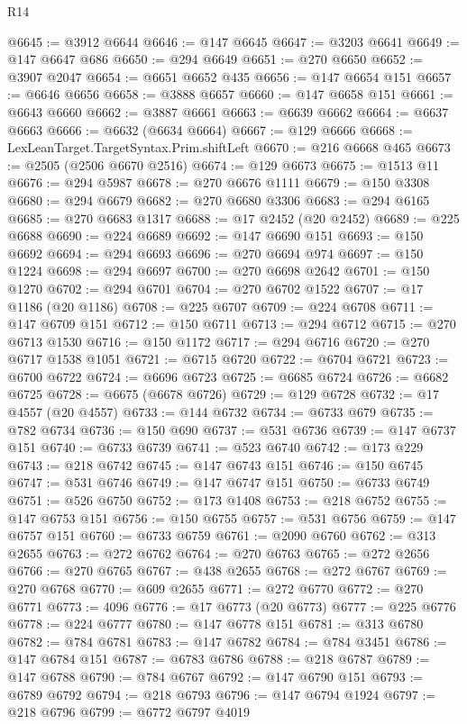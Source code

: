 \begin{lexlean}{R14}
\begin{coremodule}
@6645 := @3912 @6644
@6646 := @147 @6645
@6647 := @3203 @6641
@6649 := @147 @6647 @686
@6650 := @294 @6649
@6651 := @270 @6650
@6652 := @3907 @2047
@6654 := @6651 @6652 @435
@6656 := @147 @6654 @151
@6657 := @6646 @6656
@6658 := @3888 @6657
@6660 := @147 @6658 @151
@6661 := @6643 @6660
@6662 := @3887 @6661
@6663 := @6639 @6662
@6664 := @6637 @6663
@6666 := @6632 (@6634 @6664)
@6667 := @129 @6666
@6668 := LexLeanTarget.TargetSyntax.Prim.shiftLeft
@6670 := @216 @6668 @465
@6673 := @2505 (@2506 @6670 @2516)
@6674 := @129 @6673
@6675 := @1513 @11
@6676 := @294 @5987
@6678 := @270 @6676 @1111
@6679 := @150 @3308
@6680 := @294 @6679
@6682 := @270 @6680 @3306
@6683 := @294 @6165
@6685 := @270 @6683 @1317
@6688 := @17 @2452 (@20 @2452)
@6689 := @225 @6688
@6690 := @224 @6689
@6692 := @147 @6690 @151
@6693 := @150 @6692
@6694 := @294 @6693
@6696 := @270 @6694 @974
@6697 := @150 @1224
@6698 := @294 @6697
@6700 := @270 @6698 @2642
@6701 := @150 @1270
@6702 := @294 @6701
@6704 := @270 @6702 @1522
@6707 := @17 @1186 (@20 @1186)
@6708 := @225 @6707
@6709 := @224 @6708
@6711 := @147 @6709 @151
@6712 := @150 @6711
@6713 := @294 @6712
@6715 := @270 @6713 @1530
@6716 := @150 @1172
@6717 := @294 @6716
@6720 := @270 @6717 @1538 @1051
@6721 := @6715 @6720
@6722 := @6704 @6721
@6723 := @6700 @6722
@6724 := @6696 @6723
@6725 := @6685 @6724
@6726 := @6682 @6725
@6728 := @6675 (@6678 @6726)
@6729 := @129 @6728
@6732 := @17 @4557 (@20 @4557)
@6733 := @144 @6732
@6734 := @6733 @679
@6735 := @782 @6734
@6736 := @150 @690
@6737 := @531 @6736
@6739 := @147 @6737 @151
@6740 := @6733 @6739
@6741 := @523 @6740
@6742 := @173 @229
@6743 := @218 @6742
@6745 := @147 @6743 @151
@6746 := @150 @6745
@6747 := @531 @6746
@6749 := @147 @6747 @151
@6750 := @6733 @6749
@6751 := @526 @6750
@6752 := @173 @1408
@6753 := @218 @6752
@6755 := @147 @6753 @151
@6756 := @150 @6755
@6757 := @531 @6756
@6759 := @147 @6757 @151
@6760 := @6733 @6759
@6761 := @2090 @6760
@6762 := @313 @2655
@6763 := @272 @6762
@6764 := @270 @6763
@6765 := @272 @2656
@6766 := @270 @6765
@6767 := @438 @2655
@6768 := @272 @6767
@6769 := @270 @6768
@6770 := @609 @2655
@6771 := @272 @6770
@6772 := @270 @6771
@6773 := 4096
@6776 := @17 @6773 (@20 @6773)
@6777 := @225 @6776
@6778 := @224 @6777
@6780 := @147 @6778 @151
@6781 := @313 @6780
@6782 := @784 @6781
@6783 := @147 @6782
@6784 := @784 @3451
@6786 := @147 @6784 @151
@6787 := @6783 @6786
@6788 := @218 @6787
@6789 := @147 @6788
@6790 := @784 @6767
@6792 := @147 @6790 @151
@6793 := @6789 @6792
@6794 := @218 @6793
@6796 := @147 @6794 @1924
@6797 := @218 @6796
@6799 := @6772 @6797 @4019

\end{coremodule}
\end{lexlean}
